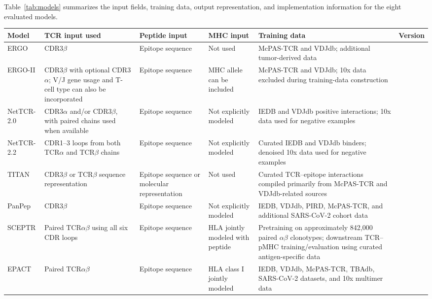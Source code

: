 \documentclass{article}
\begin{document}
Table~\ref{tab:models} summarizes the input fields, training data, output
representation, and implementation information for the eight evaluated
models.

\begin{table}[h]
\scriptsize
\centering
\begin{tabularx}{\textwidth}{l X X X X l}
\hline
\textbf{Model} &
\textbf{TCR input used} &
\textbf{Peptide input} &
\textbf{MHC input} &
\textbf{Training data} &
\textbf{Version} \\
\hline

ERGO &
CDR3$\beta$ &
Epitope sequence &
Not used &
McPAS-TCR and VDJdb; additional tumor-derived data &
\\

ERGO-II &
CDR3$\beta$ with optional CDR3$\alpha$; V/J gene usage and T-cell type can also be incorporated &
Epitope sequence &
MHC allele can be included &
McPAS-TCR and VDJdb; 10x data excluded during training-data construction &
\\

NetTCR-2.0 &
CDR3$\alpha$ and/or CDR3$\beta$, with paired chains used when available &
Epitope sequence &
Not explicitly modeled &
IEDB and VDJdb positive interactions; 10x data used for negative examples &
\\

NetTCR-2.2 &
CDR1--3 loops from both TCR$\alpha$ and TCR$\beta$ chains &
Epitope sequence &
Not explicitly modeled &
Curated IEDB and VDJdb binders; denoised 10x data used for negative examples &
\\

TITAN &
CDR3$\beta$ or TCR$\beta$ sequence representation &
Epitope sequence or molecular representation &
Not used &
Curated TCR--epitope interactions compiled primarily from McPAS-TCR and VDJdb-related sources &
\\

PanPep &
CDR3$\beta$ &
Epitope sequence &
Not explicitly modeled &
IEDB, VDJdb, PIRD, McPAS-TCR, and additional SARS-CoV-2 cohort data &
\\

SCEPTR &
Paired TCR$\alpha\beta$ using all six CDR loops &
Epitope sequence &
HLA jointly modeled with peptide &
Pretraining on approximately 842,000 paired $\alpha\beta$ clonotypes; downstream TCR--pMHC training/evaluation using curated antigen-specific data &
\\

EPACT &
Paired TCR$\alpha\beta$ &
Epitope sequence &
HLA class I jointly modeled &
IEDB, VDJdb, McPAS-TCR, TBAdb, SARS-CoV-2 datasets, and 10x multimer data &
\\


\end{tabularx}
\end{table}
\end{document}
